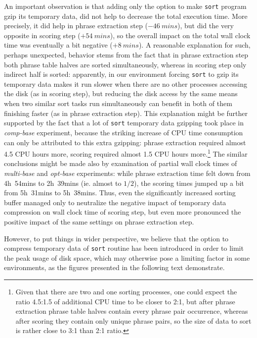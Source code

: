 An important observation is that adding only the option to make \texttt{sort} program gzip
its temporary data, did not help to decrease the total execution time.
More precisely, it did help in phrase extraction step ($-46~mins$), but did the very opposite
in scoring step ($+54~mins$), so the overall impact on the total wall clock time was eventually
a bit negative ($+8~mins$).
A reasonable explanation for such, perhaps unexpected, behavior stems from the fact that in phrase
extraction step both phrase table halves are sorted simultaneously, whereas in scoring step
only indirect half is sorted:
apparently, in our environment forcing \texttt{sort} to gzip its temporary data makes it run
slower when there are no other processes accessing the disk (as in scoring step), but reducing
the disk access by the same means when two similar sort tasks run simultaneously can benefit
in both of them finishing faster (as in phrase extraction step).
This explanation might be further supported by the fact that a lot of \texttt{sort} temporary
data gzipping took place in \emph{comp-base} experiment, because the striking increase of CPU time
consumption can only be attributed to this extra gzipping:
phrase extraction required almost 4.5 CPU hours more, scoring required almost 1.5 CPU hours
more.\footnote{Given that there are two and one sorting processes, one could expect the ratio
4.5:1.5 of additional CPU time to be closer to 2:1, but after phrase extraction phrase table halves
contain every phrase pair occurrence, whereas after scoring they contain only unique phrase pairs,
so the size of data to sort is rather close to 3:1 than 2:1 ratio.}
The similar conclusions might be made also by examination of partial wall clock times of \emph{multi-base}
and \emph{opt-base} experiments: while phrase extraction time felt down from 4h~54mins to 2h~39mins
(ie. almost to $1/2$), the scoring times jumped up a bit from 5h~31mins to 5h~38mins.
Thus, even the significantly increased sorting buffer managed only to neutralize the negative impact of
temporary data compression on wall clock time of scoring step, but even more pronounced the positive
impact of the same settings on phrase extraction step.

However, to put things in wider perspective, we believe that the option to compress temporary data of
\texttt{sort} routine has been introduced in order to limit the peak usage of disk space, which may
otherwise pose a limiting factor in some environments, as the figures presented in the following text
demonstrate.

